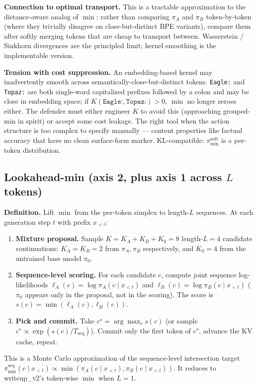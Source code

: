 \documentclass[11pt]{article}
\begin{document}
\textbf{Connection to optimal transport.} This is a tractable approximation to the distance-aware analog of $\min$: rather than comparing $\pi_A$ and $\pi_B$ token-by-token (where they trivially disagree on close-but-distinct BPE variants), compare them after softly merging tokens that are cheap to transport between. Wasserstein / Sinkhorn divergences are the principled limit; kernel smoothing is the implementable version.

\textbf{Tension with cost suppression.} An embedding-based kernel may inadvertently smooth across semantically-close-but-distinct tokens. \texttt{Eagle:} and \texttt{Topaz:} are both single-word capitalized prefixes followed by a colon and may be close in embedding space; if $K(\texttt{Eagle:}, \texttt{Topaz:}) > 0$, $\min$ no longer zeroes either. The defender must either engineer $K$ to avoid this (approaching grouped-min in spirit) or accept some cost leakage. The right tool when the action structure is too complex to specify manually — content properties like factual accuracy that have no clean surface-form marker. KL-compatible: $\pi_{\min}^{\mathrm{soft}}$ is a per-token distribution.

\subsection{Lookahead-min (axis 2, plus axis 1 across $L$ tokens)}
\label{sub:lookahead}

\textbf{Definition.} Lift $\min$ from the per-token simplex to length-$L$ sequences. At each generation step $t$ with prefix $x_{<t}$:
\begin{enumerate}[leftmargin=*, itemsep=2pt, topsep=2pt]
\item \textbf{Mixture proposal.} Sample $K = K_A + K_B + K_0 = 8$ length-$L = 4$ candidate continuations: $K_A = K_B = 2$ from $\pi_A, \pi_B$ respectively, and $K_0 = 4$ from the untrained base model $\pi_0$.
\item \textbf{Sequence-level scoring.} For each candidate $c$, compute joint sequence log-likelihoods $\ell_A(c) = \log \pi_A(c \mid x_{<t})$ and $\ell_B(c) = \log \pi_B(c \mid x_{<t})$ ($\pi_0$ appears only in the proposal, not in the scoring). The score is $s(c) = \min(\ell_A(c), \ell_B(c))$.
\item \textbf{Pick and commit.} Take $c^\star = \arg\max_c s(c)$ (or sample $c^\star \propto \exp(s(c)/T_{\mathrm{seq}})$). Commit only the first token of $c^\star$, advance the KV cache, repeat.
\end{enumerate}
This is a Monte Carlo approximation of the sequence-level intersection target $\pi^{\mathrm{seq}}_{\min}(c \mid x_{<t}) \propto \min(\pi_A(c \mid x_{<t}), \pi_B(c \mid x_{<t}))$. It reduces to writeup\_v2's token-wise $\min$ when $L = 1$.
\end{document}
